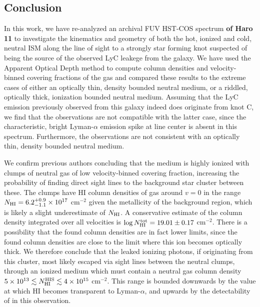 \documentclass[twocolumn,]{aastex61}
\begin{document}
\subsection{Conclusion}\label{conclusion}

In this work, we have re-analyzed an archival FUV HST-COS spectrum 
\textbf{of Haro 11} to
investigate the kinematics and geometry of both the hot, ionized and cold,
neutral ISM along the line of sight to a strongly star forming knot suspected of
being the source of the observed LyC leakege from the galaxy. We have used the
Apparent Optical Depth method to compute column densities and velocity-binned
covering fractions of the gas and compared these results to the extreme cases of
either an optically thin, density bounded neutral medium, or a riddled,
optically thick, ionization bounded neutral medium. Assuming that the LyC
emission previously observed from this galaxy indeed does originate from knot C,
we find that the observations are not compatible with the latter case, since the
characteristic, bright Lyman-$\alpha$ emission spike at line center is absent in
this spectrum. Furthermore, the observations are not consistent with an
optically thin, density bounded neutral medium.

We confirm previous authors concluding that the medium is highly ionized
with clumps of neutral gas of low velocity-binned covering fraction,
increasing the probability of finding direct sight lines to the
background star cluster between these. The clumps have HI column
densities of gas around $v=0$ in the range
$N_{\rm HI} = 6.2^{+0.9}_{-1.1} \times 10^{17}$ cm$^{-2}$ given the 
metallicity of the background  region, which is likely a slight 
underestimate of $N_{\rm HI}$. A conservative estimate of the  column
density integrated over all velocities is
$\log N_{\rm H I}^{\rm tot} = 19.01 \pm 0.17$ cm$^{-2}$. There is a possibility
that the found column densities are in fact lower limits, since the
found  column densities are close to the limit where this ion
becomes optically thick. We therefore conclude that the leaked ionizing
photons, if originating from this cluster, most likely escaped via sight
lines between the neutral clumps, through an ionized medium which must
contain a neutral gas column density
$5 \times 10^{13} \lesssim N_{\rm HI}^{\rm HIS} \lesssim 4 \times 10^{15}$
cm$^{-2}$. This range is bounded downwards by the value at which HI becomes
transparent to Lyman-$\alpha$, and upwards by the detectability of
 in this observation.
\end{document}
